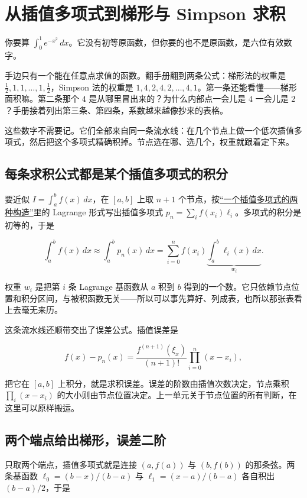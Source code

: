 \section{从插值多项式到梯形与 Simpson 求积}
\label{sec:08-Numerical-Analysis/04-Numerical-Differentiation-and-Integration/02}

你要算 \(\int_0^1e^{-x^2}\,dx\)。它没有初等原函数，但你要的也不是原函数，是六位有效数字。

手边只有一个能在任意点求值的函数。翻手册翻到两条公式：梯形法的权重是 \(\tfrac12,1,1,\dots,1,\tfrac12\)，Simpson 法的权重是 \(1,4,2,4,2,\dots,4,1\)。第一条还能看懂——梯形面积嘛。第二条那个 \(4\) 是从哪里冒出来的？为什么内部点一会儿是 \(4\) 一会儿是 \(2\)？手册接着列出第三条、第四条，系数越来越像抄来的表格。

这些数字不需要记。它们全部来自同一条流水线：在几个节点上做一个低次插值多项式，然后把这个多项式精确积掉。节点选在哪、选几个，权重就跟着定下来。

\subsection{每条求积公式都是某个插值多项式的积分}

要近似 \(I=\int_a^bf(x)\,dx\)，在 \([a,b]\) 上取 \(n+1\) 个节点，按\hyperref[sec:08-Numerical-Analysis/03-Interpolation-and-Approximation/01]{``一个插值多项式的两种构造''}里的 Lagrange 形式写出插值多项式 \(p_n=\sum_i f(x_i)\ell_i\)。多项式的积分是初等的，于是

\[
\int_a^bf(x)\,dx\approx\int_a^bp_n(x)\,dx
=\sum_{i=0}^nf(x_i)\underbrace{\int_a^b\ell_i(x)\,dx}_{w_i}.
\]

权重 \(w_i\) 是把第 \(i\) 条 Lagrange 基函数从 \(a\) 积到 \(b\) 得到的一个数。它只依赖节点位置和积分区间，与被积函数无关——所以可以事先算好、列成表，也所以那张表看上去毫无来历。

这条流水线还顺带交出了误差公式。插值误差是

\[
f(x)-p_n(x)=\frac{f^{(n+1)}(\xi_x)}{(n+1)!}\prod_{i=0}^n(x-x_i),
\]

把它在 \([a,b]\) 上积分，就是求积误差。误差的阶数由插值次数决定，节点乘积 \(\prod_i(x-x_i)\) 的大小则由节点位置决定。上一单元关于节点位置的所有判断，在这里可以原样搬运。

\subsection{两个端点给出梯形，误差二阶}

只取两个端点，插值多项式就是连接 \((a,f(a))\) 与 \((b,f(b))\) 的那条弦。两条基函数 \(\ell_0=(b-x)/(b-a)\) 与 \(\ell_1=(x-a)/(b-a)\) 各自积出 \((b-a)/2\)，于是

